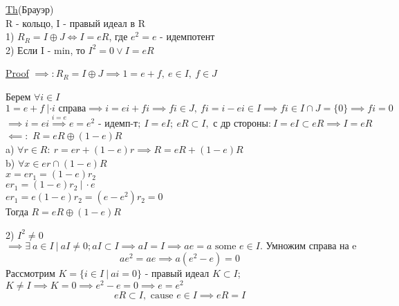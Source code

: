 \documentclass[a4paper]{article}
\begin{document}
\begin{tcolorbox}
\underline{Th}(Брауэр)\\
R - кольцо, I - правый идеал в R\\
1) $ R_R = I \oplus J \iff I = eR $, где $ e^2 = e $ - идемпотент\\
2) Если I - min, то $ I^2 = 0 \lor I = eR $ 

\underline{Proof} $ \implies: R_R = I \oplus J \implies 1 = e + f, \ e \in I, \
 f \in J $ 

 Берем $ \forall i \in I $ 
 \[
     1 = e + f \ | \cdot i \text{ справа} \implies i = ei + fi \implies
     fi \in J, \ fi = i - ei \in I \implies fi \in I \cap J = \{0\} \implies fi = 0
 \]
 \[
     \implies i = ei \stackrel{i=e}{\implies} e = e^2 \text{ - идемп-т}; \ 
     I = eI ; \ eR \subset I, \text{ с др стороны:}\ I = eI \subset eR \implies
     I = eR
 \]
 $ \impliedby: $ $ R = eR \oplus (1-e)R $ \\
 a) $ \forall r \in R: \ r = er + (1-e)r \implies R = eR + (1-e)R $\\
 b) $ \forall x \in er \cap (1-e)R $\\
 $ x = e r_1 = (1 -e)r_2 $\\
 $ e r_1 = (1-e)r_2 \ | \ \cdot e $ \\
 $ e r_1 = e(1-e)r_2 = (e - e^2)r_2 = 0 $ \\
 Тогда $ R = eR \oplus (1-e)R $ 

 2) $ I^2 \neq 0 $ 
 \[
     \implies \exists \ a \in I \ | \ aI \neq 0 ; aI \subset I \implies aI = I
     \implies ae = a \text{ some } e \in I. \text{ Умножим справа на e}
 \]
 \[
     ae^2 = ae \implies a(e^2 - e) = 0
 \]
 Рассмотрим $ K = \{ i \in I \ | \ ai = 0 \} $ - правый идеал $ K \subset I $;
 $ K \neq I \implies K = 0 \implies e^2 - e = 0 \implies e = e^2 $ 
 \[
     eR \subset I, \text{ cause } e \in I \implies eR = I
 \]
\end{tcolorbox}
\end{document}
